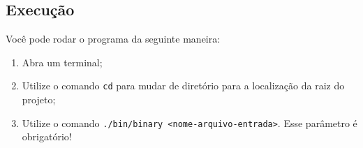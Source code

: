 \documentclass{article}
\def\code#1{\texttt{#1}}
\begin{document}
\subsection*{Execução}

Você pode rodar o programa da seguinte maneira:

\begin{enumerate}
    \item Abra um terminal;
    \item Utilize o comando \code{cd} para mudar de diretório para a localização da raiz do projeto;
    \item Utilize o comando \code{./bin/binary <nome-arquivo-entrada>}. Esse parâmetro é obrigatório!
\end{enumerate}
\end{document}
